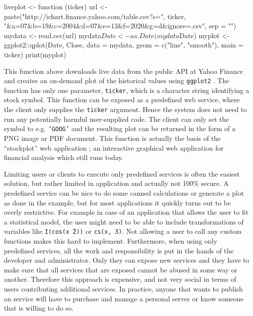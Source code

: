 \documentclass[article]{jss}
\begin{document}
\begin{CodeChunk}
\begin{CodeInput}
liveplot <- function (ticker) {
  url <- paste("http://ichart.finance.yahoo.com/table.csv?s=",
    ticker, "&a=07&b=19&c=2004&d=07&e=13&f=2020&g=d&ignore=.csv",
    sep = "")
  mydata <- read.csv(url)
  mydata$Date <- as.Date(mydata$Date)
  myplot <- ggplot2::qplot(Date, Close, data = mydata, geom = c("line",
    "smooth"), main = ticker)
  print(myplot)
}
\end{CodeInput}
\end{CodeChunk}

This function above downloads live data from the public API at Yahoo Finance and
creates an on-demand plot of the historical values using \texttt{ggplot2}
\citep{ggplot2}. The function has only one parameter, \texttt{ticker}, which is
a character string identifying a stock symbol. This function can be exposed as a
predefined web service, where the client only supplies the \texttt{ticker}
argument. Hence the system does not need to run any potentially harmful
user-supplied  code. The client can only set the symbol to e.g.
\texttt{'GOOG'} and the resulting plot can be returned in the form of a
PNG image or PDF document. This function is actually the basis of the
``stockplot'' web application \citep{stockplot}; an interactive graphical web
application for financial analysis which still runs today.

Limiting users or clients to execute only predefined services is often the
easiest solution, but rather limited in application and actually not 100\%
secure. A predefined service can be nice to do some canned calculations or
generate a plot as done in the example, but for most  applications
it quickly turns out to be overly restrictive. For example in case of an
application that allows the user to fit a statistical model, the user might
need to be able to include transformations of variables like \texttt{I(cos(x\^\ 2))} or \texttt{cs(x, 3)}. Not allowing a
user to call any custom functions makes this hard to implement.
Furthermore, when using only predefined services, all the work and
responsibility is put in the hands of the developer and administrator. Only they
can expose new services and they have to make sure that all services that are
exposed cannot be abused in some way or another. Therefore this approach is
expensive, and not very social in terms of users contributing additional
services. In practice, anyone that wants to publish an  service
will have to purchase and manage a personal server or know someone that is
willing to do so.
\end{document}
